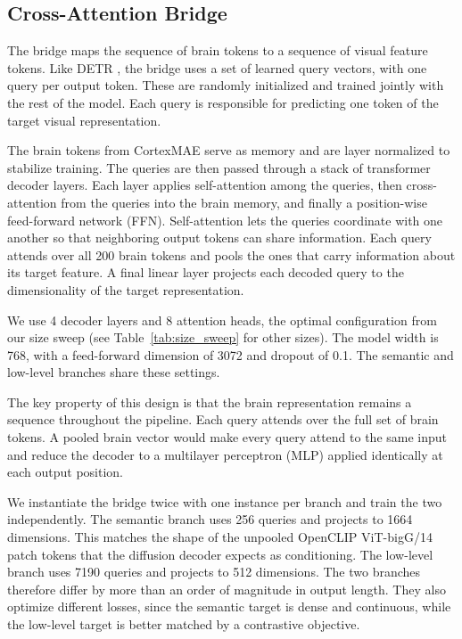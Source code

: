 \documentclass[letterpaper]{article} %
\begin{document}
\subsection{Cross-Attention Bridge}
\label{sec:bridge}
The bridge maps the sequence of brain tokens to a sequence of visual feature tokens. Like DETR \cite{DBLP:journals/corr/abs-2005-12872}, the bridge uses a set of learned query vectors, with one query per output token. These are randomly initialized and trained jointly with the rest of the model. Each query is responsible for predicting one token of the target visual representation.

The brain tokens from CortexMAE serve as memory and are layer normalized to stabilize training. The queries are then passed through a stack of transformer decoder layers. Each layer applies self-attention among the queries, then cross-attention from the queries into the brain memory, and finally a position-wise feed-forward network (FFN). Self-attention lets the queries coordinate with one another so that neighboring output tokens can share information. Each query attends over all 200 brain tokens and pools the ones that carry information about its target feature. A final linear layer projects each decoded query to the dimensionality of the target representation.

We use 4 decoder layers and 8 attention heads, the optimal configuration from our size sweep (see Table~\ref{tab:size_sweep} for other sizes). The model width is 768, with a feed-forward dimension of 3072 and dropout of 0.1. The semantic and low-level branches share these settings.

The key property of this design is that the brain representation remains a sequence throughout the pipeline. Each query attends over the full set of brain tokens. A pooled brain vector would make every query attend to the same input and reduce the decoder to a multilayer perceptron (MLP) applied identically at each output position.

We instantiate the bridge twice with one instance per branch and train the two independently. The semantic branch uses 256 queries and projects to 1664 dimensions. This matches the shape of the unpooled OpenCLIP ViT-bigG/14 \cite{radford2021learningtransferablevisualmodels, ilharco_gabriel_2021_5143773, schuhmann2022laionb} patch tokens that the diffusion decoder expects as conditioning. The low-level branch uses 7190 queries and projects to 512 dimensions. The two branches therefore differ by more than an order of magnitude in output length. They also optimize different losses, since the semantic target is dense and continuous, while the low-level target is better matched by a contrastive objective.
\end{document}
